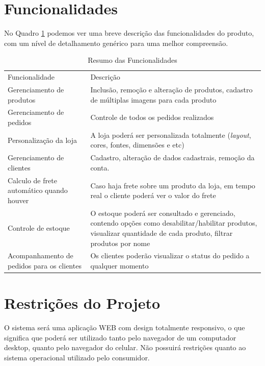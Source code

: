\documentclass[a4paper,12pt]{monografia}
\begin{document}
\section{Funcionalidades} %
\label{sec:funcionalidades}

No Quadro \ref{quadro:funcionalidades} podemos ver uma breve descrição das funcionalidades do produto, com um nível de detalhamento genérico para uma melhor compreensão.


\begin{longtable}{|p{7cm}|p{7cm}|}
\caption{Resumo das Funcionalidades}
\label{quadro:funcionalidades}
\hline
\rowcolor{ballblue}
Funcionalidade & Descrição	\\	
Gerenciamento de produtos & Inclusão, remoção e alteração de produtos, cadastro de múltiplas imagens para cada produto
\\	
\hline
Gerenciamento de pedidos & Controle de todos os pedidos realizados
\\	
\hline
Personalização da loja & A loja poderá ser personalizada totalmente (\textit{layout}, cores, fontes, dimensões e etc)
\\	
\hline
Gerenciamento de clientes & Cadastro, alteração de dados cadastrais, remoção da conta.
\\	
\hline
Calculo de frete automático quando houver & Caso haja frete sobre um produto da loja, em tempo real o cliente poderá ver o valor do frete
\\	
\hline
Controle de estoque & O estoque poderá ser consultado e gerenciado, contendo opções como desabilitar/habilitar produtos, visualizar quantidade de cada produto, filtrar produtos por nome
\\	
\hline
Acompanhamento de pedidos para os clientes & Os clientes poderão visualizar o status do pedido a qualquer momento
\\	
\hline
\end{longtable}	



\section{Restrições do Projeto} %
\label{sec:restricoes_do_projeto}

O sistema será uma aplicação WEB com design totalmente responsivo, o que significa que poderá ser utilizado tanto pelo navegador de um computador desktop, quanto pelo navegador do celular. Não possuirá restrições quanto ao sistema operacional utilizado pelo consumidor.
\end{document}
